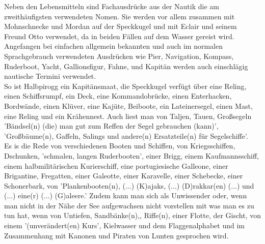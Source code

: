 {Neben den Lebensmitteln sind Fachausdrücke aus der Nautik die am zweithäufigsten verwendeten Nomen.
Sie werden vor allem zusammen mit Mohnschnecke und Mordan auf der Speckkugel und mit Eclair und seinem Freund Otto verwendet, da in beiden Fällen auf dem Wasser gereist wird.
\\
Angefangen bei einfachen allgemein bekannten und auch im normalen Sprachgebrauch verwendeten Ausdrücken wie Pier,\cite[S.21]{pir} Navigation, \cite[S.138]{pir} Kompass,\cite[S.139]{pir} Ruderboot,\cite[S.21]{pir} Yacht,\cite[S.21]{pir} Gallionsfigur,\cite[S.30]{pir} Fahne, \cite[S.51]{pir} und Kapitän \cite[S.35]{pir} werden auch einschlägig nautische Termini verwendet.
\\
So ist Halbpirogg ein Kapitänsmaat,\cite[S.50]{pir} die Speckkugel verfügt über eine Reling, \cite[S.8]{pir} einen Schiffsrumpf,\cite[S.31]{pir} ein Deck,\cite[S.49]{pir} eine Kommandobrücke,\cite[S.53]{pir} einen Enterhacken,\cite[S.53]{pir} Bordwände,\cite[S.51]{pir} einen Klüver,\cite[S.51]{pir} eine Kajüte, \cite[S.55]{pir} Beiboote, \cite[S.56]{pir} ein Lateinersegel, \cite[S.56]{pir} einen Mast, \cite[S.56]{pir} eine Reling \cite[S.57]{pir}  und ein Krähennest. \cite[S.95]{pir} Auch liest man von Taljen, \cite[S.104]{pir} Tauen, \cite[S.104]{pir} Großsegeln \cite[S.105]{pir} 'Bändsel(n) (die) man gut zum Reffen der Segel gebrauchen (kann)',\cite[S.106]{pir} 'Großbäume(n), Gaffeln, Salings und andere(n) Ersatzteile(n) für Segelschiffe'. \cite[S.107]{pir}
\\
Es is die Rede von verschiedenen Booten und Schiffen, von Kriegsschiffen, \cite[S.7]{pir} Dschunken, \cite[S.8]{pir} 'schmalen, langen Ruderbooten', \cite[S.8]{pir} einer Brigg, \cite[S.35]{pir} einem Kaufmannsschiff, \cite[S.57]{pir} einem halbmilitärischen Kurierschiff, \cite[S.94]{pir} eine portugiesische Galleone, \cite[S.94]{pir} einer Brigantine, \cite[S.105]{pir} Fregatten, \cite[S.443]{pir} einer Galeotte, \cite[S.406]{pir} einer Karavelle, \cite[S.35]{pir} einer Schebecke, \cite[S.406]{pir} einer Schonerbark, \cite[S.406]{pir} von 'Plankenbooten(n), (...) (K)ajaks, (...) (D)rakkar(en) (...) und (...) eine(r) (...) (G)aleere.' \cite[S.407]{pir} Zudem kann man sich als Unwissender oder, wenn man nicht in der Nähe der See aufgewachsen nicht vorstellen mit was man es zu tun hat, wenn von Untiefen,\cite[S.7]{pir} Sandbänke(n),\cite[S.7]{pir}, Riffe(n),\cite[S.7]{pir} einer Flotte, \cite[S.8]{pir} der Gischt,\cite[S.51]{pir} von einem '(unverändert(en) Kurs',\cite[S.313]{pir} Kielwasser \cite[S.404]{pir} und dem Flaggenalphabet \cite[S.407]{pir} und im Zusammenhang mit Kanonen und Piraten von Lunten\cite[S.51]{pir} gesprochen wird.

}
